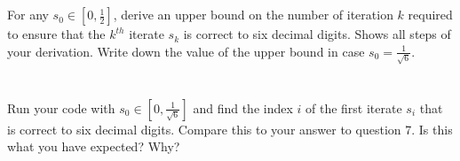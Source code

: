 \documentclass{article}
\begin{document}
\section{}
For any $s_0 \in \left[0, \frac{1}{2} \right]$, derive an upper bound on the number of iteration $k$ required to ensure that the $k^{th}$ iterate $s_k$ is correct to six decimal digits. Shows all steps of your derivation. Write down the value of the upper bound in case $s_0 = \frac{1}{\sqrt{6}}$.
\vspace{10mm}

\section{}
Run your code with $s_0 \in \left[0,\frac{1}{\sqrt{6}} \right]$ and find the index $i$ of the first iterate $s_i$ that is correct to six decimal digits. Compare this to your answer to question 7. Is this what you have expected? Why?
\vspace{10mm}
\end{document}
